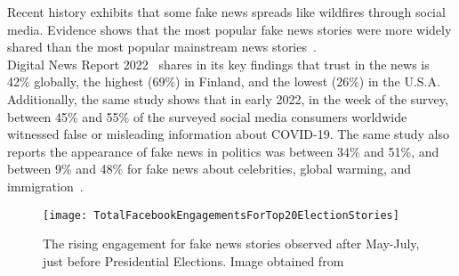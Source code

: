 Recent history exhibits that some fake news spreads like wildfires through social media. Evidence shows that the most popular fake news stories were more widely shared than the most popular mainstream news stories~\parencite{Buzzfeed_FakeNewsOutperformRealNews_Silverman}.\\
Digital News Report 2022~\parencite{ReutersInstituteDigitalNewsReport} shares in its key findings that trust in the news is 42\% globally, the highest (69\%) in Finland, and the lowest (26\%) in the U.S.A. Additionally, the same study shows that in early 2022, in the week of the survey, between 45\% and 55\% of the surveyed social media consumers worldwide witnessed false or misleading information about COVID-19. The same study also reports the appearance of fake news in politics was between 34\% and 51\%, and between 9\% and 48\% for fake news about celebrities, global warming, and immigration~\parencite{StatistaUsageOfSocialMedia_Watson}.
\begin{figure}
    \centering
    \texttt{[image: TotalFacebookEngagementsForTop20ElectionStories]}
    \caption[Total Facebook Engagements for Top 20 Election Stories]{The rising engagement for fake news stories observed after May-July, just before Presidential Elections. Image obtained from~\parencite{Buzzfeed_FakeNewsOutperformRealNews_Silverman}}\label{fig:TotalFacebookEngagementsForTop20ElectionStories}
\end{figure}
